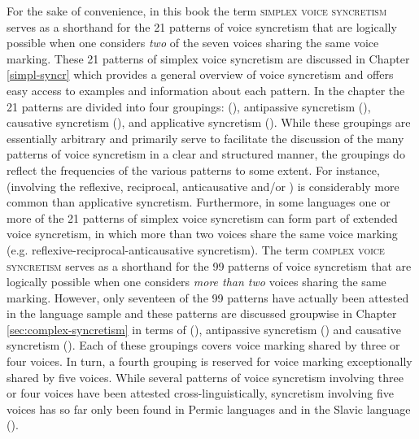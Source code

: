 For the sake of convenience, in this book the term \textsc{simplex voice syncretism} serves as a shorthand for the 21 patterns of voice syncretism that are logically possible when one considers \textit{two} of the seven voices sharing the same voice marking. These 21 patterns of simplex voice syncretism are discussed in Chapter \ref{simpl-syncr} which provides a general overview of voice syncretism and offers easy access to examples and information about each pattern. In the chapter the 21 patterns are divided into four groupings:  (), antipassive syncretism (), causative syncretism (), and applicative syncretism (). While these groupings are essentially arbitrary and primarily serve to facilitate the discussion of the many patterns of voice syncretism in a clear and structured manner, the groupings do reflect the frequencies of the various patterns to some extent. For instance,  (involving the reflexive, reciprocal, anticausative and/or ) is considerably more common than applicative syncretism. Furthermore, in some languages one or more of the 21 patterns of simplex voice syncretism can form part of extended voice syncretism, in which more than two voices share the same voice marking (e.g. reflexive-reciprocal-anticausative syncretism). The term \textsc{complex voice syncretism} serves as a shorthand for the 99 patterns of voice syncretism that are logically possible when one considers \textit{more than two} voices sharing the same marking. However, only seventeen of the 99 patterns have actually been attested in the language sample and these patterns are discussed groupwise in Chapter \ref{sec:complex-syncretism} in terms of  (), antipassive syncretism () and causative syncretism (). Each of these groupings covers voice marking shared by three or four voices. In turn, a fourth grouping is reserved for voice marking exceptionally shared by five voices. While several patterns of voice syncretism involving three or four voices have been attested cross-linguistically, syncretism involving five voices has so far only been found in Permic languages and in the Slavic language  (). 

